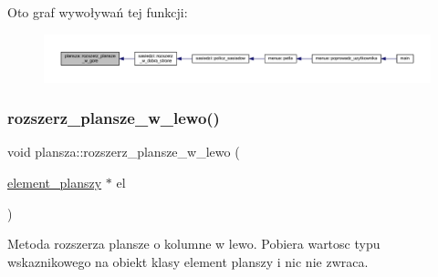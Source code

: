 Oto graf wywoływań tej funkcji\+:
\nopagebreak
\begin{figure}[H]
\begin{center}
\leavevmode
\includegraphics[width=350pt]{classplansza_a47bf5f6dea6fad229b9c525638077df8_icgraph}
\end{center}
\end{figure}
\mbox{\label{classplansza_aed692a9ce528a20a6e431d84cdb58f6b}} 
\subsubsection{\texorpdfstring{rozszerz\+\_\+plansze\+\_\+w\+\_\+lewo()}{rozszerz\_plansze\_w\_lewo()}}
{\footnotesize\ttfamily void plansza\+::rozszerz\+\_\+plansze\+\_\+w\+\_\+lewo (\begin{DoxyParamCaption}\item[{\mbox{\hyperlink{classelement__planszy}{element\+\_\+planszy}} $\ast$}]{el }\end{DoxyParamCaption})}

Metoda rozszerza plansze o kolumne w lewo. Pobiera wartosc typu wskaznikowego na obiekt klasy element planszy i nic nie zwraca.


